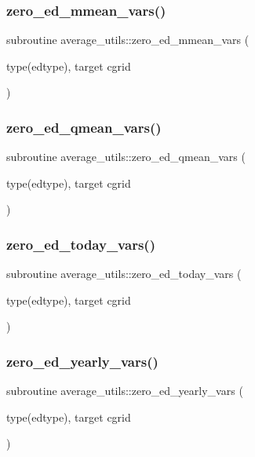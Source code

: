 \subsubsection{\texorpdfstring{zero\+\_\+ed\+\_\+mmean\+\_\+vars()}{zero\_ed\_mmean\_vars()}}
{\footnotesize\ttfamily subroutine average\+\_\+utils\+::zero\+\_\+ed\+\_\+mmean\+\_\+vars (\begin{DoxyParamCaption}\item[{type(edtype), target}]{cgrid }\end{DoxyParamCaption})}

\mbox{\label{namespaceaverage__utils_a2e9cb2592327099345c147516b927f51}} 
\subsubsection{\texorpdfstring{zero\+\_\+ed\+\_\+qmean\+\_\+vars()}{zero\_ed\_qmean\_vars()}}
{\footnotesize\ttfamily subroutine average\+\_\+utils\+::zero\+\_\+ed\+\_\+qmean\+\_\+vars (\begin{DoxyParamCaption}\item[{type(edtype), target}]{cgrid }\end{DoxyParamCaption})}

\mbox{\label{namespaceaverage__utils_a6a92d00bf7112b127a596bd765cc12c6}} 
\subsubsection{\texorpdfstring{zero\+\_\+ed\+\_\+today\+\_\+vars()}{zero\_ed\_today\_vars()}}
{\footnotesize\ttfamily subroutine average\+\_\+utils\+::zero\+\_\+ed\+\_\+today\+\_\+vars (\begin{DoxyParamCaption}\item[{type(edtype), target}]{cgrid }\end{DoxyParamCaption})}

\mbox{\label{namespaceaverage__utils_a81df7cc84b1d62f7fb950e91d410abbd}} 
\subsubsection{\texorpdfstring{zero\+\_\+ed\+\_\+yearly\+\_\+vars()}{zero\_ed\_yearly\_vars()}}
{\footnotesize\ttfamily subroutine average\+\_\+utils\+::zero\+\_\+ed\+\_\+yearly\+\_\+vars (\begin{DoxyParamCaption}\item[{type(edtype), target}]{cgrid }\end{DoxyParamCaption})}

